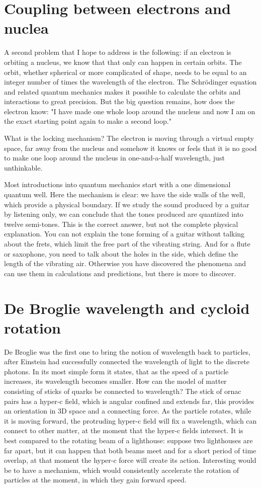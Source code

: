 \section{Coupling between electrons and nuclea}

A second problem that I hope to address is the following: if an electron is orbiting a nucleus, we know that that only can happen in certain orbits. The orbit, whether spherical or more complicated of shape, needs to be equal to an integer number of times the wavelength of the electron. The Schrödinger equation and related quantum mechanics makes it possible to calculate the orbits and interactions to great precision. But the big question remains, how does the electron know: "I have made one whole loop around the nucleus and now I am on the exact starting point again to make a second loop." 

What is the locking mechanism? The electron is moving through a virtual empty space, far away from the nucleus and somehow it knows or feels that it is no good to make one loop around the nucleus in one-and-a-half wavelength, just unthinkable.

Most introductions into quantum mechanics start with a one  dimensional quantum well. Here the mechanism is clear: we have the side walls of the well, which provide a physical boundary. If we study the sound produced by a guitar by listening only, we can conclude that the tones produced are quantized into twelve semi-tones. This is the correct answer, but not the complete physical explanation. You can not explain the tone forming of a guitar without talking about the frets, which limit the free part of the vibrating string. And for a flute or saxophone, you need to talk about the holes in the side, which define the length of the vibrating air. Otherwise you have discovered the phenomena and can use them in calculations and predictions, but there is more to discover.

\section{De Broglie wavelength and cycloid rotation}

De Broglie was the first one to bring the notion of wavelength back to particles, after Einstein had successfully connected the wavelength of light to the discrete photons. In its most simple form it states, that as the speed of a particle increases, its wavelength becomes smaller. How can the model of matter consisting of sticks of quarks be connected to wavelength? The stick of ornac pairs has a hyper-c field, which is angular confined and extends far, this provides an orientation in 3D space and a connecting force. As the particle rotates, while it is moving forward, the protruding hyper-c field will fix a wavelength, which can connect to other matter, at the moment that the hyper-c fields intersect. It is best compared to the rotating beam of a lighthouse: suppose two lighthouses are far apart, but it can happen that both beams meet and for a short period of time overlap, at that moment the hyper-c force will create its action.
Interesting would be to have a mechanism, which would consistently accelerate the rotation of particles at the moment, in which they gain forward speed.

